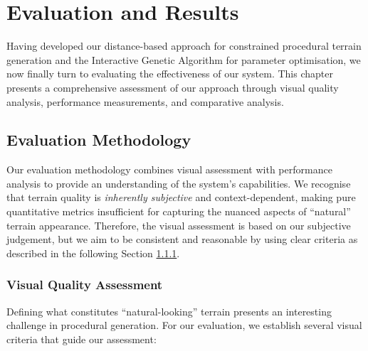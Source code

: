 \chapter{Evaluation and Results}
\label{Chapter5}

Having developed our distance-based approach for constrained procedural terrain generation and the Interactive Genetic Algorithm for parameter optimisation, we now finally turn to evaluating the effectiveness of our system. This chapter presents a comprehensive assessment of our approach through visual quality analysis, performance measurements, and comparative analysis. 

\section{Evaluation Methodology}

Our evaluation methodology combines visual assessment with performance analysis to provide an understanding of the system's capabilities. We recognise that terrain quality is \textit{inherently subjective} and context-dependent, making pure quantitative metrics insufficient for capturing the nuanced aspects of ``natural'' terrain appearance. Therefore, the visual assessment is based on our subjective judgement, but we aim to be consistent and reasonable by using clear criteria as described in the following Section \ref{visual_crit}. 

\subsection{Visual Quality Assessment}
\label{visual_crit}

Defining what constitutes ``natural-looking'' terrain presents an interesting challenge in procedural generation. For our evaluation, we establish several visual criteria that guide our assessment:


